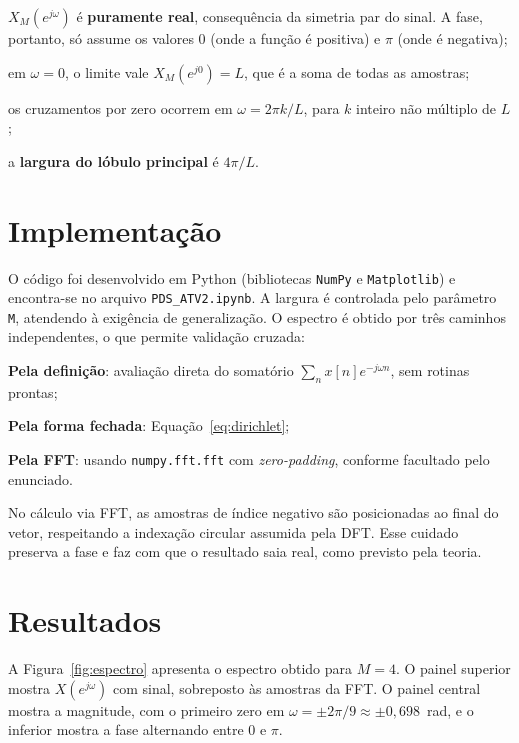\documentclass[
    12pt,
    openright,
    oneside,
    a4paper,
    chapter=TITLE,
    section=TITLE,
    brazil
]{abntex2}
\begin{document}
\begin{alineas}
\item $X_M(e^{j\omega})$ é \textbf{puramente real}, consequência da simetria par do
sinal. A fase, portanto, só assume os valores $0$ (onde a função é positiva) e $\pi$
(onde é negativa);
\item em $\omega = 0$, o limite vale $X_M(e^{j0}) = L$, que é a soma de todas as
amostras;
\item os cruzamentos por zero ocorrem em $\omega = 2\pi k/L$, para $k$ inteiro não
múltiplo de $L$;
\item a \textbf{largura do lóbulo principal} é $4\pi/L$.
\end{alineas}

\section{Implementação}

O código foi desenvolvido em Python (bibliotecas \texttt{NumPy} e \texttt{Matplotlib}) e
encontra-se no arquivo \texttt{PDS\_ATV2.ipynb}. A largura é controlada pelo parâmetro
\texttt{M}, atendendo à exigência de generalização. O espectro é obtido por três
caminhos independentes, o que permite validação cruzada:

\begin{alineas}
\item \textbf{Pela definição}: avaliação direta do somatório
$\sum_n x[n]e^{-j\omega n}$, sem rotinas prontas;
\item \textbf{Pela forma fechada}: Equação~\eqref{eq:dirichlet};
\item \textbf{Pela FFT}: usando \texttt{numpy.fft.fft} com \emph{zero-padding},
conforme facultado pelo enunciado.
\end{alineas}

No cálculo via FFT, as amostras de índice negativo são posicionadas ao final do vetor,
respeitando a indexação circular assumida pela DFT. Esse cuidado preserva a fase e faz
com que o resultado saia real, como previsto pela teoria.

\section{Resultados}

A Figura~\ref{fig:espectro} apresenta o espectro obtido para $M = 4$. O painel superior
mostra $X(e^{j\omega})$ com sinal, sobreposto às amostras da FFT. O painel central mostra a magnitude, com o primeiro zero em
$\omega = \pm 2\pi/9 \approx \pm 0{,}698$~rad, e o inferior mostra a fase alternando
entre $0$ e $\pi$.
\end{document}
